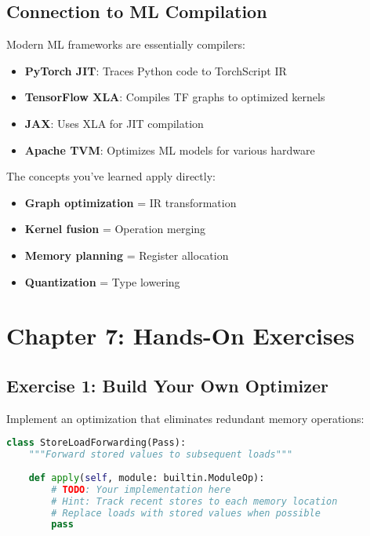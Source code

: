 \documentclass[11pt,a4paper]{article}
\begin{document}
\subsection{Connection to ML Compilation}

Modern ML frameworks are essentially compilers:

\begin{itemize}
    \item \textbf{PyTorch JIT}: Traces Python code to TorchScript IR
    \item \textbf{TensorFlow XLA}: Compiles TF graphs to optimized kernels
    \item \textbf{JAX}: Uses XLA for JIT compilation
    \item \textbf{Apache TVM}: Optimizes ML models for various hardware
\end{itemize}

The concepts you've learned apply directly:
\begin{itemize}
    \item \textbf{Graph optimization} = IR transformation
    \item \textbf{Kernel fusion} = Operation merging
    \item \textbf{Memory planning} = Register allocation
    \item \textbf{Quantization} = Type lowering
\end{itemize}

\section{Chapter 7: Hands-On Exercises}

\subsection{Exercise 1: Build Your Own Optimizer}

Implement an optimization that eliminates redundant memory operations:

\begin{lstlisting}[language=Python, caption=Exercise: Store-Load Forwarding]
class StoreLoadForwarding(Pass):
    """Forward stored values to subsequent loads"""
    
    def apply(self, module: builtin.ModuleOp):
        # TODO: Your implementation here
        # Hint: Track recent stores to each memory location
        # Replace loads with stored values when possible
        pass
\end{lstlisting}
\end{document}
